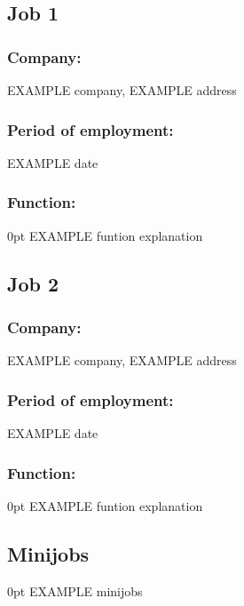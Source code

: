 \documentclass[a4paper,11pt]{article}
\newlength{\myindent}
\begin{document}
    \subsection{Job 1}
            \subsubsection{Company:}
                EXAMPLE company, EXAMPLE address
            \vspace{-.8em}
            \subsubsection{Period of employment:}
                EXAMPLE date
            \vspace{-.8em}
            \subsubsection{Function:}
            \begin{addmargin}[\myindent]{0pt}
                EXAMPLE funtion explanation
            \end{addmargin}
            \vspace{-.25em}
    \subsection{Job 2}
            \subsubsection{Company:}
                EXAMPLE company, EXAMPLE address
            \vspace{-.8em}
            \subsubsection{Period of employment:}
                EXAMPLE date
            \vspace{-.8em}
            \subsubsection{Function:}
            \begin{addmargin}[\myindent]{0pt}
                EXAMPLE funtion explanation
            \end{addmargin}
            \vspace{-.25em}
    \subsection{Minijobs}
        \begin{addmargin}[\myindent]{0pt}
            EXAMPLE minijobs
        \end{addmargin}
        \vspace{-.25em}
\end{document}
